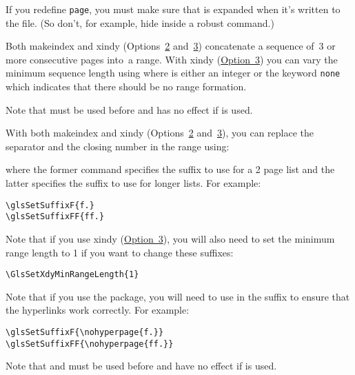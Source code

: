 \documentclass[report,inlinetitle]{nlctdoc}
\newcommand*{\opt}[1]{\hyperlink{option#1}{Option~#1}}
\newcommand*{\optsand}[2]{Options~\hyperlink{option#1}{#1}
and~\hyperlink{option#2}{#2}}
\begin{document}
\begin{important}
If you redefine \texttt{page},
you must make sure that  is expanded when it's written to
the file. (So don't, for example, hide  inside a robust
command.)
\end{important}

Both \gls{makeindex} and \gls{xindy} (\optsand23) concatenate a
sequence of~3 or more consecutive pages into~a range. With 
\gls*{xindy} (\opt3) you can vary the minimum sequence length using
\linebreak
{} where  is either
an integer or the keyword \texttt{none} which indicates that there
should be no range formation.

\begin{important}
Note that  must be used before
 and has no effect if  is used.
\end{important}

With both \gls{makeindex} and \gls{xindy} (\optsand23), you can replace
the separator and the closing number in the range using:
\begin{definition}[\DescribeMacro{\glsSetSuffixF}]
\end{definition}
\begin{definition}[\DescribeMacro{\glsSetSuffixFF}]
\end{definition}
where the former command specifies the suffix to use for a 2 page
list and the latter specifies the suffix to use for longer lists.
For example:
\begin{verbatim}
\glsSetSuffixF{f.}
\glsSetSuffixFF{ff.}
\end{verbatim}
Note that if you use \gls{xindy} (\opt3), you will also need to
set the minimum range length to 1 if you want to change these
suffixes:
\begin{verbatim}
\GlsSetXdyMinRangeLength{1}
\end{verbatim}
Note that if you use the  package, you will need
to use  in the suffix to ensure that the hyperlinks
work correctly. For example:
\begin{verbatim}
\glsSetSuffixF{\nohyperpage{f.}}
\glsSetSuffixFF{\nohyperpage{ff.}}
\end{verbatim}

\begin{important}
Note that  and  must be used 
before  and have no effect if  is 
used.
\end{important}
\end{document}
